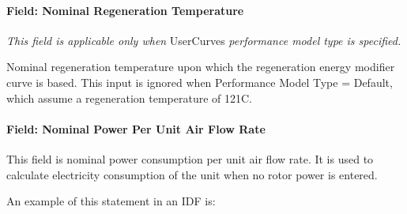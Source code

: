 \paragraph{Field: Nominal Regeneration Temperature}\label{field-nominal-regeneration-temperature}

\emph{This field is applicable only when} UserCurves \emph{performance model type is specified.}

Nominal regeneration temperature upon which the regeneration energy modifier curve is based. This input is ignored when Performance Model Type = Default, which assume a regeneration temperature of 121C.

\paragraph{Field: Nominal Power Per Unit Air Flow Rate}\label{field-nominal-power-per-unit-air-flow-rate}

This field is nominal power consumption per unit air flow rate. It is used to calculate electricity consumption of the unit when no rotor power is entered.

An example of this statement in an IDF is:

